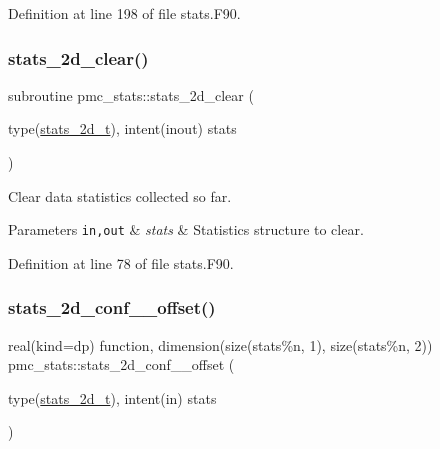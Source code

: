 Definition at line 198 of file stats.\+F90.

\mbox{\label{namespacepmc__stats_a4416bf7fadf595f6954554bcda94f144}} 
\subsubsection{\texorpdfstring{stats\+\_\+2d\+\_\+clear()}{stats\_2d\_clear()}}
{\footnotesize\ttfamily subroutine pmc\+\_\+stats\+::stats\+\_\+2d\+\_\+clear (\begin{DoxyParamCaption}\item[{type(\mbox{\hyperlink{structpmc__stats_1_1stats__2d__t}{stats\+\_\+2d\+\_\+t}}), intent(inout)}]{stats }\end{DoxyParamCaption})}



Clear data statistics collected so far. 


\begin{DoxyParams}[1]{Parameters}
\mbox{\tt in,out}  & {\em stats} & Statistics structure to clear. \\
\hline
\end{DoxyParams}


Definition at line 78 of file stats.\+F90.

\mbox{\label{namespacepmc__stats_a4b54545fdbc6ea7302c947217f65a3cf}} 
\subsubsection{\texorpdfstring{stats\+\_\+2d\+\_\+conf\+\_\+\_\+offset()}{stats\_2d\_conf\_95\_offset()}}
{\footnotesize\ttfamily real(kind=dp) function, dimension(size(stats\%n, 1),          size(stats\%n, 2)) pmc\+\_\+stats\+::stats\+\_\+2d\+\_\+conf\+\_\+\_\+offset (\begin{DoxyParamCaption}\item[{type(\mbox{\hyperlink{structpmc__stats_1_1stats__2d__t}{stats\+\_\+2d\+\_\+t}}), intent(in)}]{stats }\end{DoxyParamCaption})}



